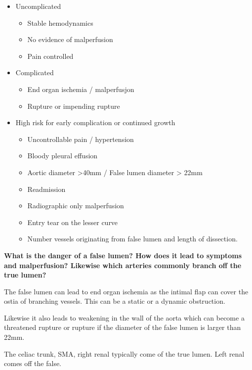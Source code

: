 \documentclass[
]{book}
\begin{document}
\begin{itemize}
\item
  Uncomplicated

  \begin{itemize}
  \item
    Stable hemodynamics
  \item
    No evidence of malperfusion
  \item
    Pain controlled
  \end{itemize}
\item
  Complicated

  \begin{itemize}
  \item
    End organ ischemia / malperfusjon
  \item
    Rupture or impending rupture
  \end{itemize}
\item
  High risk for early complication or continued
  growth\citep{vanbogerijen2014, reutersberg2018}

  \begin{itemize}
  \item
    Uncontrollable pain / hypertension
  \item
    Bloody pleural effusion
  \item
    Aortic diameter \textgreater40mm / False lumen diameter \textgreater{} 22mm
  \item
    Readmission
  \item
    Radiographic only malperfusion
  \item
    Entry tear on the lesser curve
  \item
    Number vessels originating from false lumen and length of
    dissection.\citep{brunkwall2014, kamman2017, nienaber2009}
  \end{itemize}
\end{itemize}

\textbf{What is the danger of a false lumen? How does it lead to symptoms and
malperfusion? Likewise which arteries commonly branch off the true
lumen?}

The false lumen can lead to end organ ischemia as the intimal flap can
cover the ostia of branching vessels. This can be a static or a dynamic
obstruction.

Likewise it also leads to weakening in the wall of the aorta which can
become a threatened rupture or rupture if the diameter of the false
lumen is larger than 22mm.

The celiac trunk, SMA, right renal typically come of the true lumen.
Left renal comes off the false.
\end{document}
